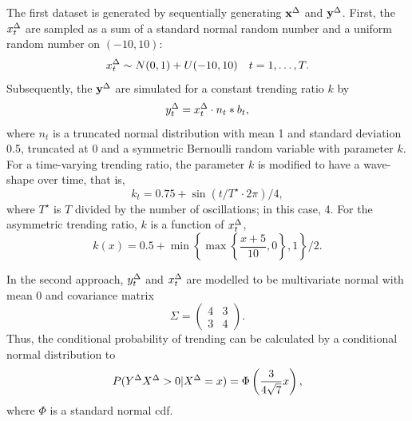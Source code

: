 The first dataset is generated by sequentially generating $\mathbf{x}^{\Delta}$ and $\mathbf{y}^{\Delta}$.
First, the $x^{\Delta}_t$ are sampled as a sum of a standard normal random number and a uniform random number on $(-10, 10)$:
\begin{equation*}
    x^{\Delta}_t \sim N(0, 1) + U(-10, 10) \quad t = 1, \dots, T.
\end{equation*}
Subsequently, the $\mathbf{y}^{\Delta}$ are simulated for a constant trending ratio $k$ by
\begin{equation*}
    y^{\Delta}_t = x^{\Delta}_t \cdot n_t * b_t,
\end{equation*}
where $n_t$ is a truncated normal distribution with mean 1 and standard deviation 0.5, truncated at 0 and a symmetric Bernoulli random variable with parameter $k$.
For a time-varying trending ratio, the parameter $k$ is modified to have a wave-shape over time, that is,
\begin{equation*}
    k_t = 0.75 + \sin(t / T^\star \cdot 2 \pi) / 4,
\end{equation*}
where $T^\star$ is $T$ divided by the number of oscillations; in this case, 4.
For the asymmetric trending ratio, $k$ is a function of $x^{\Delta}_t$,
\begin{equation*}
    k(x) = 0.5 + \min \left\{ \max \left\{ \frac{x + 5}{10}, 0  \right\} , 1 \right\} / 2.
\end{equation*}

In the second approach, $y^{\Delta}_t$ and $x^{\Delta}_t$ are modelled to be multivariate normal with mean 0 and covariance matrix
\begin{equation*}
    \Sigma = \begin{pmatrix} 4 & 3 \\ 3 & 4 \end{pmatrix}.
\end{equation*}
Thus, the conditional probability of trending can be calculated by a conditional normal distribution to
\begin{equation*}
    P(Y^{\Delta} X^{\Delta} > 0 | X^{\Delta} = x) = \Phi \left( \frac{3}{4 \sqrt{7}} x \right),
\end{equation*}
where $\Phi$ is a standard normal \ac{cdf}.

